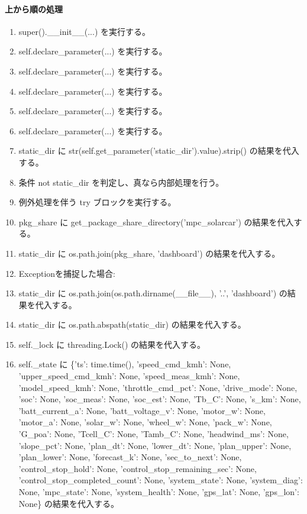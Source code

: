 \documentclass[a4paper,11pt]{article}
\begin{document}
            \paragraph{上から順の処理}
            \begin{enumerate}[leftmargin=1.8em]
            \item super().\_\_init\_\_(...) を実行する。
\item self.declare\_parameter(...) を実行する。
\item self.declare\_parameter(...) を実行する。
\item self.declare\_parameter(...) を実行する。
\item self.declare\_parameter(...) を実行する。
\item self.declare\_parameter(...) を実行する。
\item static\_dir に str(self.get\_parameter('static\_dir').value).strip() の結果を代入する。
\item 条件 not static\_dir を判定し、真なら内部処理を行う。
\item   例外処理を伴う try ブロックを実行する。
\item     pkg\_share に get\_package\_share\_directory('mpc\_solarcar') の結果を代入する。
\item     static\_dir に os.path.join(pkg\_share, 'dashboard') の結果を代入する。
\item     Exceptionを捕捉した場合:
\item     static\_dir に os.path.join(os.path.dirname(\_\_file\_\_), '..', 'dashboard') の結果を代入する。
\item static\_dir に os.path.abspath(static\_dir) の結果を代入する。
\item self.\_lock に threading.Lock() の結果を代入する。
\item self.\_state に \{'ts': time.time(), 'speed\_cmd\_kmh': None, 'upper\_speed\_cmd\_kmh': None, 'speed\_meas\_kmh': None, 'model\_speed\_kmh': None, 'throttle\_cmd\_pct': None, 'drive\_mode': None, 'soc': None, 'soc\_meas': None, 'soc\_est': None, 'Tb\_C': None, 's\_km': None, 'batt\_current\_a': None, 'batt\_voltage\_v': None, 'motor\_w': None, 'motor\_a': None, 'solar\_w': None, 'wheel\_w': None, 'pack\_w': None, 'G\_poa': None, 'Tcell\_C': None, 'Tamb\_C': None, 'headwind\_ms': None, 'slope\_pct': None, 'plan\_dt': None, 'lower\_dt': None, 'plan\_upper': None, 'plan\_lower': None, 'forecast\_k': None, 'sec\_to\_next': None, 'control\_stop\_hold': None, 'control\_stop\_remaining\_sec': None, 'control\_stop\_completed\_count': None, 'system\_state': None, 'system\_diag': None, 'mpc\_state': None, 'system\_health': None, 'gps\_lat': None, 'gps\_lon': None\} の結果を代入する。

\end{enumerate}
\end{document}
